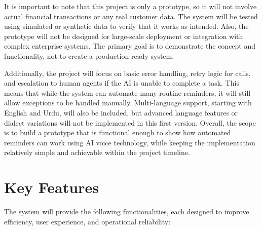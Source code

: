 \documentclass[12pt,a4paper]{report}
\begin{document}
It is important to note that this project is only a prototype, so it will not involve actual financial transactions or any real customer data. The system will be tested using simulated or synthetic data to verify that it works as intended. Also, the prototype will not be designed for large-scale deployment or integration with complex enterprise systems. The primary goal is to demonstrate the concept and functionality, not to create a production-ready system. 

Additionally, the project will focus on basic error handling, retry logic for calls, and escalation to human agents if the AI is unable to complete a task. This means that while the system can automate many routine reminders, it will still allow exceptions to be handled manually. Multi-language support, starting with English and Urdu, will also be included, but advanced language features or dialect variations will not be implemented in this first version. Overall, the scope is to build a prototype that is functional enough to show how automated reminders can work using AI voice technology, while keeping the implementation relatively simple and achievable within the project timeline.

\section{Key Features}

The system will provide the following functionalities, each designed to improve efficiency, user experience, and operational reliability:
\end{document}
